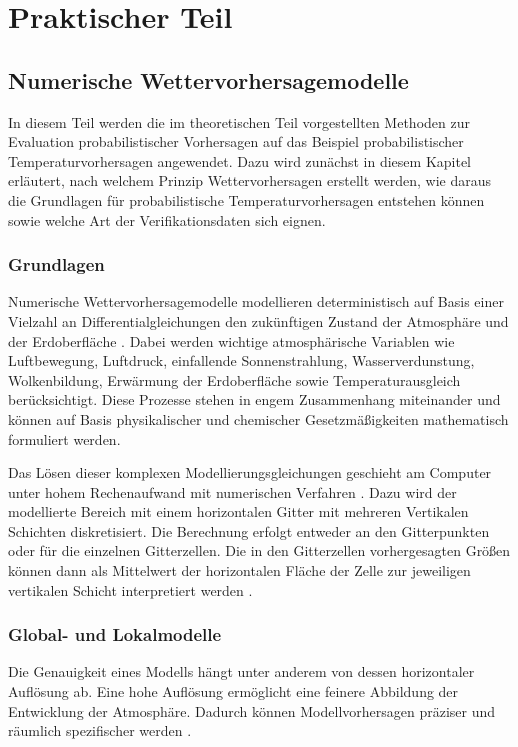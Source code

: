 \part{Praktischer Teil}


\chapter{Numerische Wettervorhersagemodelle} \label{chap:nwp}
In diesem Teil werden die im theoretischen Teil vorgestellten Methoden zur Evaluation probabilistischer Vorhersagen auf das Beispiel probabilistischer Temperaturvorhersagen angewendet. Dazu wird zunächst in diesem Kapitel erläutert, nach welchem Prinzip Wettervorhersagen erstellt werden, wie daraus die Grundlagen für probabilistische Temperaturvorhersagen entstehen können sowie welche Art der Verifikationsdaten sich eignen.

\section{Grundlagen}
Numerische Wettervorhersagemodelle modellieren deterministisch auf Basis einer Vielzahl an Differentialgleichungen den zukünftigen Zustand der Atmosphäre und der Erdoberfläche \parencite{dwd_numerische_vorhersagemodelle}. Dabei werden wichtige atmosphärische Variablen wie Luftbewegung, Luftdruck, einfallende Sonnenstrahlung, Wasserverdunstung, Wolkenbildung, Erwärmung der Erdoberfläche sowie Temperaturausgleich berücksichtigt. Diese Prozesse stehen in engem Zusammenhang miteinander und können auf Basis physikalischer und chemischer Gesetzmäßigkeiten mathematisch formuliert werden.

Das Lösen dieser komplexen Modellierungsgleichungen geschieht am Computer unter hohem Rechenaufwand mit numerischen Verfahren \parencite{DWD_wie_entsteht}. Dazu wird der modellierte Bereich mit einem horizontalen Gitter mit mehreren Vertikalen Schichten diskretisiert. Die Berechnung erfolgt entweder an den Gitterpunkten oder für die einzelnen Gitterzellen. Die in den Gitterzellen vorhergesagten Größen können dann als Mittelwert der horizontalen Fläche der Zelle zur jeweiligen vertikalen Schicht interpretiert werden \parencite{reinert2025icon_dwd}.


\section{Global- und Lokalmodelle}
Die Genauigkeit eines Modells hängt unter anderem von dessen horizontaler Auflösung ab. Eine hohe Auflösung ermöglicht eine feinere Abbildung der Entwicklung der Atmosphäre. Dadurch können Modellvorhersagen präziser und räumlich spezifischer werden \parencite{DWD_wie_entsteht}. 

